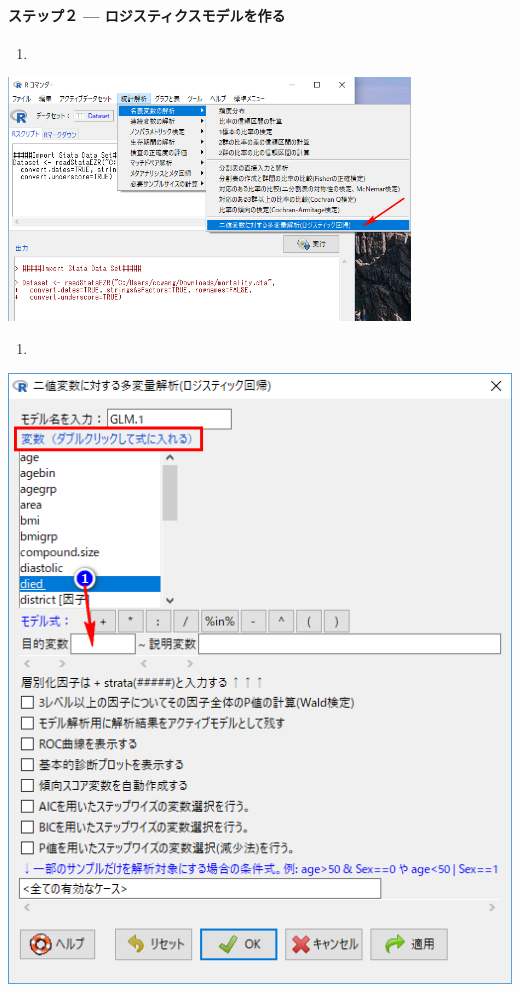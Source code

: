 \documentclass[11pt,]{problemset}
\let\oldparagraph\paragraph
\renewcommand{\paragraph}[1]{\oldparagraph{#1}\mbox{}}
\begin{document}
\hypertarget{-}{%
\paragraph{ステップ２ --- ロジスティクスモデルを作る}\label{-}}

\begin{enumerate}
\def\labelenumi{\arabic{enumi}.}
\setcounter{enumi}{5}
\item
\end{enumerate}

\begin{center}\includegraphics[width=0.8\textwidth,height=0.9\textwidth]{pic/logstic05} \end{center}

\newpage
\vfill

\begin{enumerate}
\def\labelenumi{\arabic{enumi}.}
\setcounter{enumi}{6}
\item
\end{enumerate}

\begin{center}\includegraphics[width=0.5\linewidth]{pic/logstic06} \end{center}
\end{document}
